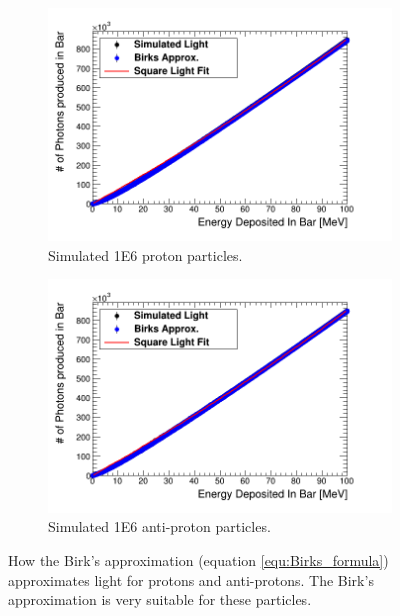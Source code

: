 \begin{figure}[htbp]
\centering
\begin{subfigure}{.5\textwidth}
  \centering
  \includegraphics[width=\linewidth]{Appendix5/newFigs/protonBirksSlab_simAndApproxLight.png}
  \captionsetup{width=.9\linewidth}
  \caption{Simulated 1E6 proton particles.}
  \label{subfig:append5_light_of_protons0-100mev}
\end{subfigure}%
\begin{subfigure}{.5\textwidth}
  \centering
  \includegraphics[width=\linewidth]{Appendix5/newFigs/aProtonBirksSlab_simAndApproxLight.png}
  \captionsetup{width=.9\linewidth}
  \caption{Simulated 1E6 anti-proton particles.}
  \label{subfig:append5_light_of_Aprotons0-100mev}
\end{subfigure}
\caption{How the Birk's approximation (equation \ref{equ:Birks_formula}) approximates light for protons and anti-protons. The Birk's approximation is very suitable for these particles.}
\label{fig:append5_light_of_protons_Aprotons0-100mev}
\end{figure}

